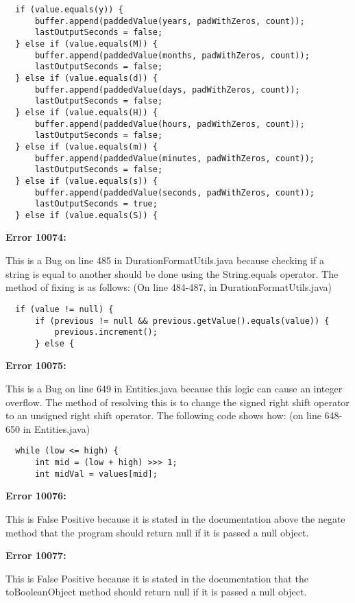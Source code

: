 \documentclass{article}
\begin{document}
\begin{enumerate}[(a)]
  \begin{lstlisting}
  if (value.equals(y)) {
      buffer.append(paddedValue(years, padWithZeros, count));
      lastOutputSeconds = false;
  } else if (value.equals(M)) {
      buffer.append(paddedValue(months, padWithZeros, count));
      lastOutputSeconds = false;
  } else if (value.equals(d)) {
      buffer.append(paddedValue(days, padWithZeros, count));
      lastOutputSeconds = false;
  } else if (value.equals(H)) {
      buffer.append(paddedValue(hours, padWithZeros, count));
      lastOutputSeconds = false;
  } else if (value.equals(m)) {
      buffer.append(paddedValue(minutes, padWithZeros, count));
      lastOutputSeconds = false;
  } else if (value.equals(s)) {
      buffer.append(paddedValue(seconds, padWithZeros, count));
      lastOutputSeconds = true;
  } else if (value.equals(S)) {
  \end{lstlisting}

  \textbf{Error 10074:}

  This is a Bug on line 485 in DurationFormatUtils.java because checking if a string is equal to another should be done using the String.equals operator. The method of fixing is as follows: (On line 484-487, in DurationFormatUtils.java)

  \begin{lstlisting}
  if (value != null) {
      if (previous != null && previous.getValue().equals(value)) {
          previous.increment();
      } else {
  \end{lstlisting}

  \textbf{Error 10075:}

  This is a Bug on line 649 in Entities.java because this logic can cause an integer overflow. The method of resolving this is to change the signed right shift operator to an unsigned right shift operator. The following code shows how: (on line 648-650 in Entities.java)
  
  \begin{lstlisting}
  while (low <= high) {
      int mid = (low + high) >>> 1;
      int midVal = values[mid];

  \end{lstlisting}

  \textbf{Error 10076:}

  This is False Positive because it is stated in the documentation above the negate method that the program should return null if it is passed a null object.
  
  \textbf{Error 10077:}
  
  This is False Positive because it is stated in the documentation that the toBooleanObject method should return null if it is passed a null object.
  

\end{enumerate}
\end{document}
